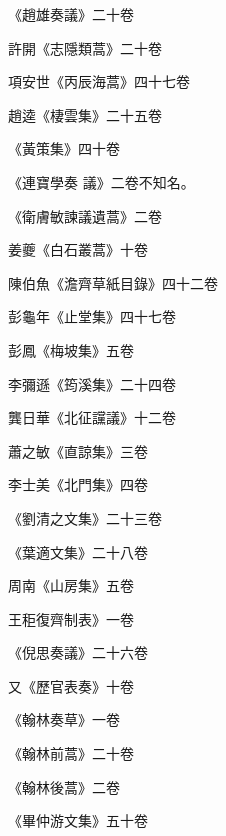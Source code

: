 \begin{pinyinscope}
 《趙雄奏議》二十卷



 許開《志隱類蒿》二十卷



 項安世《丙辰海蒿》四十七卷



 趙逵《棲雲集》二十五卷



 《黃策集》四十卷



 《連寶學奏
 議》二卷不知名。



 《衛膚敏諫議遺蒿》二卷



 姜夔《白石叢蒿》十卷



 陳伯魚《澹齊草紙目錄》四十二卷



 彭龜年《止堂集》四十七卷



 彭鳳《梅坡集》五卷



 李彌遜《筠溪集》二十四卷



 龔日華《北征讜議》十二卷



 蕭之敏《直諒集》三卷



 李士美《北門集》四卷



 《劉清之文集》二十三卷



 《葉適文集》二十八卷



 周南《山房集》五卷



 王秬復齊制表》一卷



 《倪思奏議》二十六卷



 又《歷官表奏》十卷



 《翰林奏草》一卷



 《翰林前蒿》二十卷



 《翰林後蒿》二卷



 《畢仲游文集》五十卷




\end{pinyinscope}
